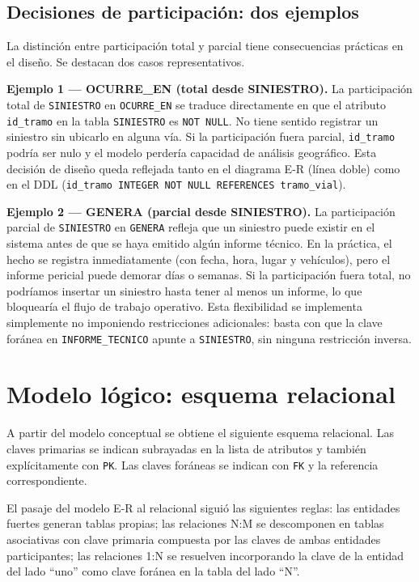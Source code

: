 \documentclass[12pt,a4paper]{article}
\begin{document}
\subsection*{Decisiones de participación: dos ejemplos}

La distinción entre participación total y parcial tiene consecuencias prácticas en el diseño. Se destacan dos casos representativos.

\textbf{Ejemplo 1 --- OCURRE\_EN (total desde SINIESTRO).} La participación total de \texttt{SINIESTRO} en \texttt{OCURRE\_EN} se traduce directamente en que el atributo \texttt{id\_tramo} en la tabla \texttt{SINIESTRO} es \texttt{NOT NULL}. No tiene sentido registrar un siniestro sin ubicarlo en alguna vía. Si la participación fuera parcial, \texttt{id\_tramo} podría ser nulo y el modelo perdería capacidad de análisis geográfico. Esta decisión de diseño queda reflejada tanto en el diagrama E-R (línea doble) como en el DDL (\texttt{id\_tramo INTEGER NOT NULL REFERENCES tramo\_vial}).

\textbf{Ejemplo 2 --- GENERA (parcial desde SINIESTRO).} La participación parcial de \texttt{SINIESTRO} en \texttt{GENERA} refleja que un siniestro puede existir en el sistema antes de que se haya emitido algún informe técnico. En la práctica, el hecho se registra inmediatamente (con fecha, hora, lugar y vehículos), pero el informe pericial puede demorar días o semanas. Si la participación fuera total, no podríamos insertar un siniestro hasta tener al menos un informe, lo que bloquearía el flujo de trabajo operativo. Esta flexibilidad se implementa simplemente no imponiendo restricciones adicionales: basta con que la clave foránea en \texttt{INFORME\_TECNICO} apunte a \texttt{SINIESTRO}, sin ninguna restricción inversa.

\section{Modelo lógico: esquema relacional}

A partir del modelo conceptual se obtiene el siguiente esquema relacional. Las claves primarias se indican subrayadas en la lista de atributos y también explícitamente con \texttt{PK}. Las claves foráneas se indican con \texttt{FK} y la referencia correspondiente.

El pasaje del modelo E-R al relacional siguió las siguientes reglas: las entidades fuertes generan tablas propias; las relaciones N:M se descomponen en tablas asociativas con clave primaria compuesta por las claves de ambas entidades participantes; las relaciones 1:N se resuelven incorporando la clave de la entidad del lado ``uno'' como clave foránea en la tabla del lado ``N''.
\end{document}
